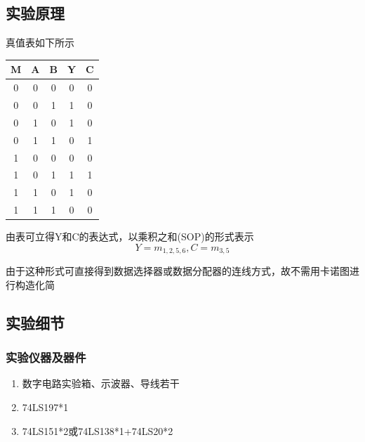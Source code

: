 \documentclass[11pt,UTF8]{ctexart}
\begin{document}
\subsection{实验原理}
\par 真值表如下所示
\begin{table}[H]
  \centering
    \begin{tabular}{|c|c|c|c|c|}
    \hline
    M     & A     & B     & Y     & C \bigstrut\\
    \hline
    0     & 0     & 0     & 0     & 0 \bigstrut\\
    \hline
    0     & 0     & 1     & \textcolor[rgb]{ 1,  0,  0}{1} & 0 \bigstrut\\
    \hline
    0     & 1     & 0     & \textcolor[rgb]{ 1,  0,  0}{1} & 0 \bigstrut\\
    \hline
    0     & 1     & 1     & 0     & \textcolor[rgb]{ 1,  0,  0}{1} \bigstrut\\
    \hline
    1     & 0     & 0     & 0     & 0 \bigstrut\\
    \hline
    1     & 0     & 1     & \textcolor[rgb]{ 1,  0,  0}{1} & \textcolor[rgb]{ 1,  0,  0}{1} \bigstrut\\
    \hline
    1     & 1     & 0     & \textcolor[rgb]{ 1,  0,  0}{1} & 0 \bigstrut\\
    \hline
    1     & 1     & 1     & 0     & 0 \bigstrut\\
    \hline
    \end{tabular}%
\end{table}%
\par 由表可立得Y和C的表达式，以乘积之和(SOP)的形式表示
\[Y=m_{1,2,5,6},C=m_{3,5}\]
\par 由于这种形式可直接得到数据选择器或数据分配器的连线方式，故不需用卡诺图进行构造化简

\subsection{实验细节}
\subsubsection{实验仪器及器件}
\begin{enumerate}
    \item 数字电路实验箱、示波器、导线若干
    \item 74LS197*1
    \item 74LS151*2或74LS138*1+74LS20*2
\end{enumerate}
\end{document}
